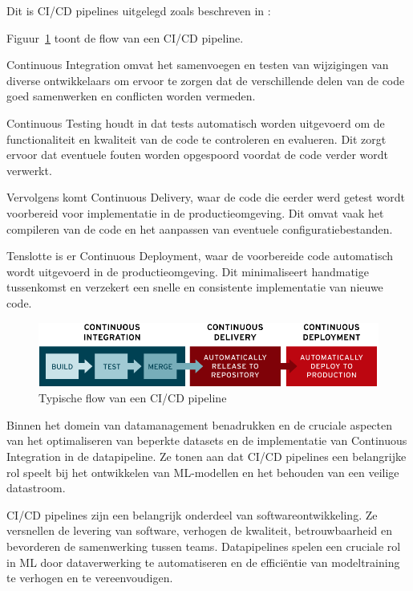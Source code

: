 
Dit is CI/CD pipelines uitgelegd zoals beschreven in \textcite{NaveenVemuri2024}:

Figuur~\ref{fig:CICD_flow} toont de flow van een CI/CD pipeline. %

Continuous Integration omvat het samenvoegen en testen van wijzigingen van diverse ontwikkelaars om ervoor te zorgen dat de verschillende delen van de code goed samenwerken en conflicten worden vermeden.

Continuous Testing houdt in dat tests automatisch worden uitgevoerd om de functionaliteit en kwaliteit van de code te controleren en evalueren. Dit zorgt ervoor dat eventuele fouten worden opgespoord voordat de code verder wordt verwerkt.

Vervolgens komt Continuous Delivery, waar de code die eerder werd getest wordt voorbereid voor implementatie in de productieomgeving. Dit omvat vaak het compileren van de code en het aanpassen van eventuele configuratiebestanden.

Tenslotte is er Continuous Deployment, waar de voorbereide code automatisch wordt uitgevoerd in de productieomgeving. Dit minimaliseert handmatige tussenkomst en verzekert een snelle en consistente implementatie van nieuwe code.\newline

\begin{figure}
    \includegraphics[width=\linewidth]{graphics/cdci.png}
    \caption{Typische flow van een CI/CD pipeline \autocite{RedHat2023}}
    \label{fig:CICD_flow}
\end{figure}

Binnen het domein van datamanagement benadrukken \textcite{Samad2018} en \textcite{Vadavalasa2020} de cruciale aspecten van het optimaliseren van beperkte datasets en de implementatie van Continuous Integration in de datapipeline. Ze tonen aan dat CI/CD pipelines een belangrijke rol speelt bij het ontwikkelen van ML-modellen en het behouden van een veilige datastroom.

CI/CD pipelines zijn een belangrijk onderdeel van softwareontwikkeling. Ze versnellen de levering van software, verhogen de kwaliteit, betrouwbaarheid en bevorderen de samenwerking tussen teams. Datapipelines spelen een cruciale rol in ML door dataverwerking te automatiseren en de efficiëntie van modeltraining te verhogen en te vereenvoudigen.
